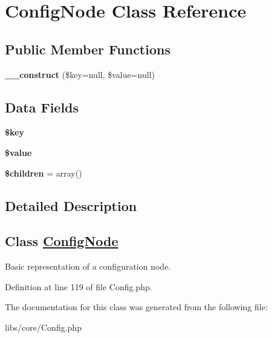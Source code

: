 \hypertarget{class_config_node}{\section{\-Config\-Node \-Class \-Reference}
\label{class_config_node}
}
\subsection*{\-Public \-Member \-Functions}
\begin{DoxyCompactItemize}
\item 
\hypertarget{class_config_node_ae98792bfbbbb8c711653f58922662699}{{\bfseries \-\_\-\-\_\-construct} (\$key=null, \$value=null)}\label{class_config_node_ae98792bfbbbb8c711653f58922662699}

\end{DoxyCompactItemize}
\subsection*{\-Data \-Fields}
\begin{DoxyCompactItemize}
\item 
\hypertarget{class_config_node_aa60b0284e0dfa2463495481cf11e3cf4}{{\bfseries \$key}}\label{class_config_node_aa60b0284e0dfa2463495481cf11e3cf4}

\item 
\hypertarget{class_config_node_a0f298096f322952a72a50f98a74c7b60}{{\bfseries \$value}}\label{class_config_node_a0f298096f322952a72a50f98a74c7b60}

\item 
\hypertarget{class_config_node_aafda1a84fe840800c9884c167093f759}{{\bfseries \$children} = array()}\label{class_config_node_aafda1a84fe840800c9884c167093f759}

\end{DoxyCompactItemize}


\subsection{\-Detailed \-Description}
\subsection*{\-Class \hyperlink{class_config_node}{\-Config\-Node}}

\-Basic representation of a configuration node. 

\-Definition at line 119 of file \-Config.\-php.



\-The documentation for this class was generated from the following file\-:\begin{DoxyCompactItemize}
\item 
libs/core/\-Config.\-php\end{DoxyCompactItemize}
